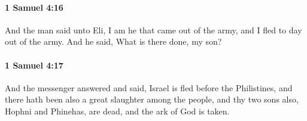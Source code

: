 		\paragraph{1 Samuel 4:16} %
			\label{1SAMUEL-4-16}

			And the man said unto Eli, I am he that came out of the army, and I fled to day out of the army. And he said, What is there done, my son?


		\paragraph{1 Samuel 4:17} %
			\label{1SAMUEL-4-17}

			And the messenger answered and said, Israel is fled before the Philistines, and there hath been also a great slaughter among the people, and thy two sons also, Hophni and Phinehas, are dead, and the ark of God is taken.



